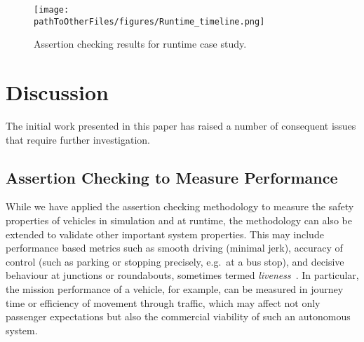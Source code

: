 


\begin{figure}
    \centering
    \texttt{[image: \\pathToOtherFiles/figures/Runtime\_timeline.png]}
    \caption{Assertion checking results for runtime case study.}
    \label{fig:Runtime_timeline}
\end{figure} 

\section{Discussion} \label{discussion}
The initial work presented in this paper has raised a number of consequent issues that require further investigation.

\subsection{Assertion Checking to Measure Performance}
While we have applied the assertion checking methodology to measure the safety properties of vehicles in simulation and at runtime, the methodology can also be extended to validate other important system properties. This may include performance based metrics such as smooth driving (minimal jerk), accuracy of control (such as parking or stopping precisely, e.g.\ at a bus stop), and decisive behaviour at junctions or roundabouts, sometimes termed \emph{liveness}~\cite{kim2014mpc}. In particular, the mission performance of a vehicle, for example, can be measured in journey time or efficiency of movement through traffic, which may affect not only passenger expectations but also the commercial viability of such an autonomous system. 

